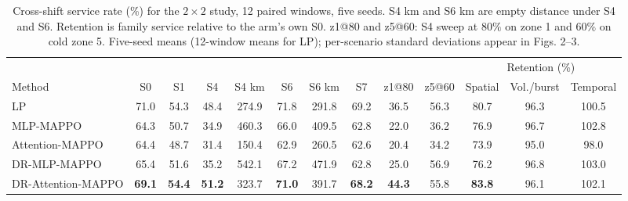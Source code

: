 \documentclass[3p,times,procedia]{elsarticle}
\begin{document}
\begin{table}[tbp]
\centering
\caption{Cross-shift service rate (\%) for the $2\times2$ study, 12 paired windows, five seeds. S4 km and S6 km are empty distance under S4 and S6. Retention is family service relative to the arm's own S0. z1@80 and z5@60: S4 sweep at $80\%$ on zone 1 and $60\%$ on cold zone 5. Five-seed means (12-window means for LP); per-scenario standard deviations appear in Figs. 2--3.}
\label{tab:shift}
\scriptsize
\setlength{\tabcolsep}{2.0pt}
\begin{tabular}{lcccccccccccc}
\toprule
 & & & & & & & & & & \multicolumn{3}{c}{Retention (\%)} \\
\cmidrule(lr){11-13}
Method & S0 & S1 & S4 & S4 km & S6 & S6 km & S7 & z1@80 & z5@60 & Spatial & Vol./burst & Temporal \\
\midrule
LP                 & 71.0 & 54.3 & 48.4 & 274.9 & 71.8 & 291.8 & 69.2 & 36.5 & 56.3 & 80.7 & 96.3 & 100.5 \\
MLP-MAPPO          & 64.3 & 50.7 & 34.9 & 460.3 & 66.0 & 409.5 & 62.8 & 22.0 & 36.2 & 76.9 & 96.7 & 102.8 \\
Attention-MAPPO    & 64.4 & 48.7 & 31.4 & 150.4 & 62.9 & 260.5 & 62.6 & 20.4 & 34.2 & 73.9 & 95.0 & 98.0 \\
DR-MLP-MAPPO       & 65.4 & 51.6 & 35.2 & 542.1 & 67.2 & 471.9 & 62.8 & 25.0 & 56.9 & 76.2 & 96.8 & 103.0 \\
DR-Attention-MAPPO & \textbf{69.1} & \textbf{54.4} & \textbf{51.2} & 323.7 & \textbf{71.0} & 391.7 & \textbf{68.2} & \textbf{44.3} & 55.8 & \textbf{83.8} & 96.1 & 102.1 \\
\bottomrule
\end{tabular}
\end{table}
\end{document}
